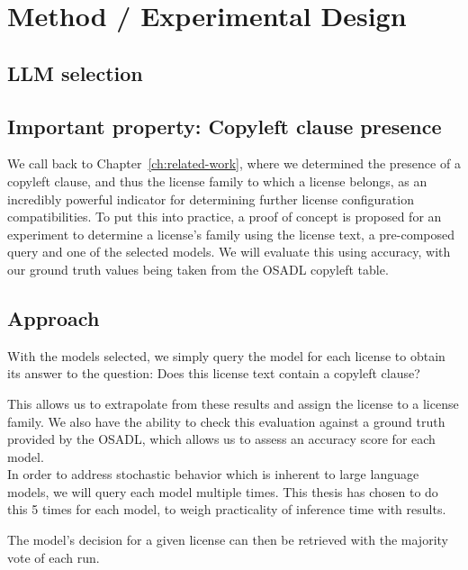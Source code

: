 
\chapter{Method / Experimental Design}\label{ch:method}

\section{LLM selection}

 
\section{Important property: Copyleft clause presence}

We call back to Chapter~\ref{ch:related-work}, where we determined the presence of a copyleft clause, and thus the license family to which a license belongs, as an incredibly powerful indicator for determining further license configuration compatibilities. To put this into practice, a proof of concept is proposed for an experiment to determine a license's family using the license text, a pre-composed query and one of the selected models. We will evaluate this using accuracy, with our ground truth values being taken from the OSADL copyleft table.

\section{Approach}

With the models selected, we simply query the model for each license to obtain its answer to the question: Does this license text contain a copyleft clause?

This allows us to extrapolate from these results and assign the license to a license family. We also have the ability to check this evaluation against a ground truth provided by the OSADL, which allows us to assess an accuracy score for each model. \\

In order to address stochastic behavior which is inherent to large language models, we will query each model multiple times. This thesis has chosen to do this 5 times for each model, to weigh practicality of inference time with results.

The model's decision for a given license can then be retrieved with the majority vote of each run. \\

